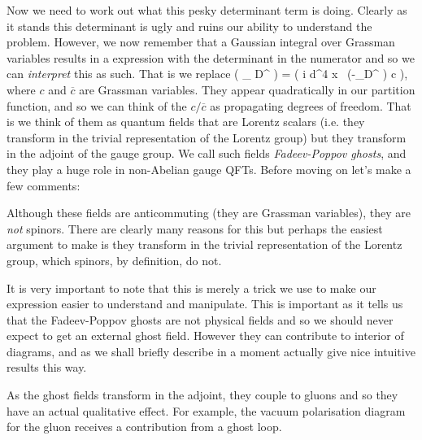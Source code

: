 Now we need to work out what this pesky determinant term is doing. Clearly as it stands this determinant is ugly and ruins our ability to understand the problem. However, we now remember that a Gaussian integral over Grassman variables results in a expression with the determinant in the numerator and so we can \textit{interpret} this as such. That is we replace 
\be 
\label{eqn:DeterminantToGhosts}
	\det\big( \p_{\mu} D^{\mu} \big) = \int [\pD c][\pD \overline{c}] \exp \bigg( i  \int d^4 x \,  \big(-\p_{\mu}D^{\mu} \big) c \bigg),
\ee
where $c$ and $\overline{c}$ are Grassman variables. They appear quadratically in our partition function, and so we can think of  the $c/\overline{c}$ as propagating degrees of freedom. That is we think of them as quantum fields that are Lorentz scalars (i.e. they transform in the trivial representation of the Lorentz group) but they transform in the adjoint of the gauge group. We call such fields \textit{Fadeev-Poppov ghosts}, and they play a huge role in non-Abelian gauge QFTs. Before moving on let’s make a few comments:
\ben[label=(\roman*)]
	\item Although these fields are anticommuting (they are Grassman variables), they are \textit{not} spinors. There are clearly many reasons for this but perhaps the easiest argument to make is they transform in the trivial representation of the Lorentz group, which spinors, by definition, do not. 
	\item It is very important to note that this is merely a trick we use to make our expression easier to understand and manipulate. This is important as it tells us that the Fadeev-Poppov ghosts are not physical fields and so we should never expect to get an external ghost field. However they can contribute to interior of diagrams, and as we shall briefly describe in a moment actually give nice intuitive results this way.
	\item As the ghost fields transform in the adjoint, they couple to gluons and so they have an actual qualitative effect. For example, the vacuum polarisation diagram for the gluon receives a contribution from a ghost loop. 
\een 

